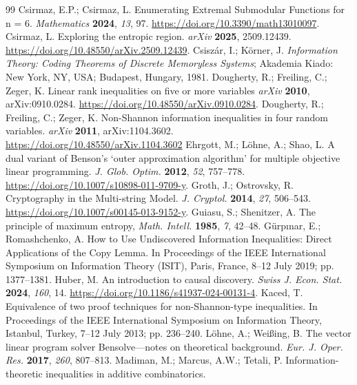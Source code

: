 \documentclass[reqno]{amsart}
\theoremstyle{definition}
\begin{document}
\begin{thebibliography}{99}
%
 Csirmaz, E.P.; Csirmaz, L. 
  Enumerating Extremal Submodular Functions for n = 6.
  \emph{Mathematics} \textbf{2024}, \emph{13}, 97.
   \url{https://doi.org/10.3390/math13010097}.
%
 Csirmaz, L.
  Exploring the entropic region.
  \emph{arXiv} \textbf{2025}, 2509.12439.
  \url{https://doi.org/10.48550/arXiv.2509.12439}.
%
 Csisz\'ar, I.; K\"orner, J. 
  \emph{Information Theory: Coding Theorems of Discrete Memoryless Systems};
  Akademia Kiado: New York, NY, USA; Budapest, Hungary, 1981.
%
 Dougherty, R.; Freiling, C.; Zeger, K.
  {Linear rank inequalities on five or more variables}
  \emph{arXiv} \textbf{2010}, arXiv:0910.0284.
  \url{https://doi.org/10.48550/arXiv.0910.0284}.
%
 Dougherty, R.; Freiling, C.; Zeger, K. 
  {Non-Shannon information inequalities in four random variables}.
  \emph{arXiv} \textbf{2011},   arXiv:1104.3602.
  \url{https://doi.org/10.48550/arXiv.1104.3602}
%
 Ehrgott, M.; Löhne, A.; Shao, L. 
  A dual variant of Benson's ‘outer approximation algorithm’ for multiple objective
  linear programming.
  \emph{J. Glob. Optim.} \textbf{2012}, \emph{52}, 757--778.
  \url{https://doi.org/10.1007/s10898-011-9709-y}.
%
 Groth, J.; Ostrovsky, R.
  Cryptography in the Multi-string Model.
  \emph{J. Cryptol.} \textbf{2014}, \emph{27}, 506--543.
  \url{https://doi.org/10.1007/s00145-013-9152-y}.
%
 Guiasu, S.; Shenitzer, A. 
  The principle of maximum entropy,
  \emph{ Math. Intell.} \textbf{1985}, {\emph{7}}, 42--48.
%
 Gürpınar, E.; Romashchenko, A.
  How to Use Undiscovered Information Inequalities: Direct Applications of the Copy Lemma.
  In Proceedings of the IEEE International Symposium on Information Theory (ISIT),
  Paris, France, 8--12  July 2019; pp. 1377--1381.
%
  Huber, M. 
 An introduction to causal discovery.
 \emph{Swiss J. Econ. Stat.} \textbf{2024}, {\emph{160}}, 14.
 \url{https://doi.org/10.1186/s41937-024-00131-4}.
%
 Kaced, T. 
  Equivalence of two proof techniques for non-Shannon-type inequalities.
  In Proceedings of the IEEE International Symposium on Information Theory, 
  Istanbul, Turkey, 7--12 July  2013; pp.  236--240.
%
 Löhne, A.; Weißing, B. 
  The vector linear program solver Bensolve---notes on theoretical background.
  \emph{Eur. J. Oper. Res.} \textbf{2017}, {\emph{260}}, 807--813.
%
 Madiman, M.; Marcus, A.W.; Tetali, P.
\newblock Information-theoretic inequalities in additive combinatorics.

\end{thebibliography}
\end{document}

